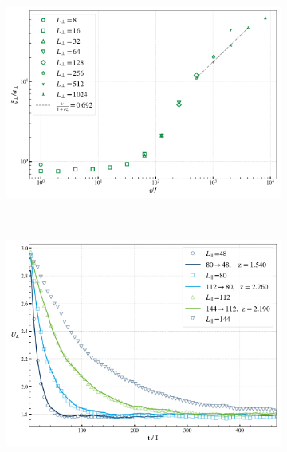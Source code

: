 \begin{figure}
\begin{subfigure}{0.475\textwidth}
		\end{subfigure}
		\begin{subfigure}{0.475\textwidth}
			\centering		
			\includegraphics[width=0.97\linewidth]{graphics/tau-xi-perp-small-eta-2.png}
		\end{subfigure} \\ \par\bigskip
		\begin{subfigure}{0.475\textwidth}
			\centering		
			\includegraphics[width=0.97\linewidth]{graphics/z-eta-0.5.png}
		\end{subfigure}
		\begin{subfigure}{0.475\textwidth}
			\centering

\end{subfigure}
\end{figure}
